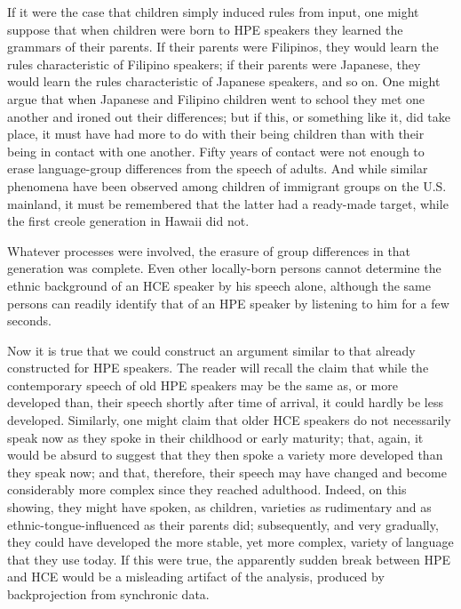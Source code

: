 If it were the case that children simply induced rules from input, one might suppose that when children were born to HPE speakers they learned the grammars of their parents. If their parents were Filipinos, they would learn the rules characteristic of Filipino speakers; if their parents were Japanese, they would learn the rules characteristic of Japanese speakers, and so on. One might argue that when Japanese and Filipino children went to school they met one another and ironed out their differences; but if this, or something like it, did take place, it must have had more to do with their being children than with their being in contact with one another. Fifty years of contact were not enough to erase language-group differences from the speech of adults. And while similar phenomena have been observed among children of immigrant groups on the U.S. mainland, it must be remembered that the latter had a ready-made target, while the first creole generation in Hawaii did not.

Whatever processes were involved, the erasure of group differences in that generation was complete. Even other locally-born persons cannot determine the ethnic background of an HCE speaker by his speech alone, although the same persons can readily identify that of an HPE speaker by listening to him for a few seconds.


\largerpage[-1]
Now it is true that we could construct an argument similar to that already constructed for HPE speakers. The reader will recall the claim that while the contemporary speech of old HPE speakers may be the same as, or more developed than, their speech shortly after time of
arrival, it could hardly be less developed. Similarly, one might claim that older HCE speakers do not necessarily speak now as they spoke in their childhood or early maturity; that, again, it would be absurd to suggest that they then spoke a variety more developed than they speak now; and that, therefore, their speech may have changed and become considerably more complex since they reached adulthood. Indeed, on this showing, they might have spoken, as children, varieties as rudimentary and as ethnic-tongue-influenced as their parents did; subsequently, and very gradually, they could have developed the more stable, yet more complex, variety of language that they use today. If this were true, the apparently sudden break between HPE and HCE would be a misleading artifact of the analysis, produced by back\-projection from synchronic data.

